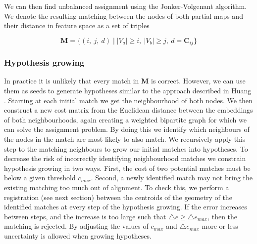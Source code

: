 We can then find unbalanced assignment using the Jonker-Volgenant algorithm. We denote the resulting matching between the nodes of both partial maps and their distance in feature space as a set of triples 

\begin{equation}
    \label{eq:M}
    \mathbf{M} = \{(i,\ j,\ d) \mid  |V_a| \geq i,\ |V_b|\geq j,\ d = \mathbf{C}_{ij}\}
\end{equation}

\subsubsection{Hypothesis growing}

In practice it is unlikely that every match in \(\mathbf{M}\) is correct. However, we can use them as seeds to generate hypotheses similar to the approach described in Huang \citep{huang_topological_2005}. Starting at each initial match we get the neighbourhood of both nodes. We then construct a new cost matrix from the Euclidean distance between the embeddings of both neighbourhoods, again creating a weighted bipartite graph for which we can solve the assignment problem. By doing this we identify which neighbours of the nodes in the match are most likely to also match. We recursively apply this step to the matching neighbours to grow our initial matches into hypotheses. To decrease the risk of incorrectly identifying neighbourhood matches we constrain hypothesis growing in two ways. First, the cost of two potential matches must be below a given threshold \(c_{max}\). Second, a newly identified match may not bring the existing matching too much out of alignment. To check this, we perform a registration (see next section) between the centroids of the geometry of the identified matches at every step of the hypothesis growing. If the error increases between steps, and the increase is too large such that \(\triangle e \geq \triangle e_{max} \), then the matching is rejected. By adjusting the values of \(c_{max}\) and \(\triangle e_{max}\) more or less uncertainty is allowed when growing hypotheses.
